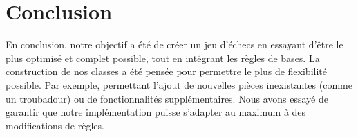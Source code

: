 \documentclass[12pt]{article}
\begin{document}
\section{Conclusion}

En conclusion, notre objectif a été de créer un jeu d'échecs en essayant d'être le plus optimisé et complet possible, tout en intégrant les règles de bases. La construction de nos classes a été pensée pour permettre le plus de flexibilité possible. Par exemple, permettant l'ajout de nouvelles pièces inexistantes (comme un troubadour) ou de fonctionnalités supplémentaires. Nous avons essayé de garantir que notre implémentation puisse s'adapter au maximum à des modifications de règles. 
\end{document}
